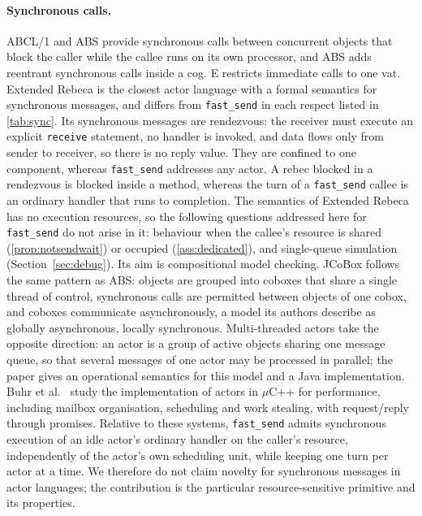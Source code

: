 \documentclass[11pt]{article}
\theoremstyle{definition}
\theoremstyle{remark}
\newcommand{\fs}{\texttt{fast\_send}}
\begin{document}
\paragraph{Synchronous calls.} ABCL/1 \cite{yonezawa1986} and ABS \cite{johnsen2012abs}
provide synchronous calls between concurrent objects that block the caller while the
callee runs on its own processor, and ABS adds reentrant synchronous calls inside a cog.
E \cite{miller2005} restricts immediate calls to one vat. Extended Rebeca
\cite{sirjani2005extended,sirjani2005jucs} is the closest actor language with a formal
semantics for synchronous messages, and differs from \fs{} in each respect listed in
\cref{tab:sync}. Its synchronous messages are rendezvous: the receiver must execute an
explicit \texttt{receive} statement, no handler is invoked, and data flows only from
sender to receiver, so there is no reply value. They are confined to one component,
whereas \fs{} addresses any actor. A rebec blocked in a rendezvous is blocked inside a
method, whereas the turn of a \fs{} callee is an ordinary handler that runs to
completion. The semantics of Extended Rebeca has no execution resources, so the
following questions addressed here for \fs{} do not arise in it: behaviour when the
callee's resource is shared (\cref{prop:notsendwait}) or occupied (\cref{ass:dedicated}),
and single-queue simulation (Section~\ref{sec:debug}). Its aim is compositional model
checking.
JCoBox \cite{schafer2010jcobox} follows the same pattern as ABS: objects are grouped
into coboxes that share a single thread of control, synchronous calls are permitted
between objects of one cobox, and coboxes communicate asynchronously, a model its
authors describe as globally asynchronous, locally synchronous. Multi-threaded actors
\cite{azadbakht2016mta} take the opposite direction: an actor is a group of active objects
sharing one message queue, so that several messages of one actor may be processed in
parallel; the paper gives an operational semantics for this model and a Java
implementation. Buhr et al.\ \cite{buhr2023extended} study the implementation of actors
in $\mu$C++ for performance, including mailbox organisation, scheduling and work
stealing, with request/reply through promises. Relative to these systems, \fs{} admits
synchronous execution of an idle actor's ordinary handler on the caller's resource,
independently of the actor's own scheduling unit, while keeping one turn per actor at a
time.
We therefore do not claim novelty for synchronous messages in actor languages; the
contribution is the particular resource-sensitive primitive and its properties.
\end{document}

